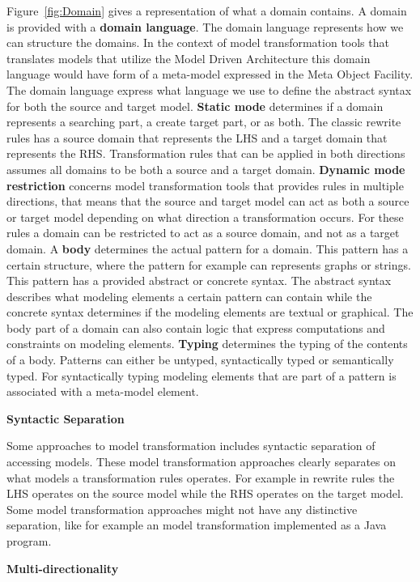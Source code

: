 Figure~\ref{fig:Domain} gives a representation of what a domain contains. A
domain is provided with a \textbf{domain language}. The domain language
represents how we can structure the domains. In the context of model
transformation tools that translates models that utilize the Model Driven
Architecture this domain language would have form of a meta-model expressed in
the Meta Object Facility. The domain language express what language we use to
define the abstract syntax for both the source and target model. \textbf{Static
mode} determines if a domain represents a searching part, a create target part, 
or as both. The classic rewrite rules has a source domain that represents the
LHS and a target domain that represents the RHS. Transformation rules that can
be applied in both directions assumes all domains to be both a source and a
target domain. \textbf{Dynamic mode restriction} concerns model transformation
tools that provides rules in multiple directions, that means that the source
and target model can act as both a source or target model depending on what
direction a transformation occurs. For these rules a domain can be restricted to
act as a source domain, and not as a target domain. A \textbf{body} determines
the actual pattern for a domain. This pattern has a certain structure, where the
pattern for example can represents graphs or strings. This pattern has a
provided abstract or concrete syntax. The abstract syntax describes what
modeling elements a certain pattern can contain while the concrete syntax
determines if the modeling elements are textual or graphical. The body part of a
domain can also contain logic that express computations and constraints on
modeling elements. \textbf{Typing} determines the typing of the contents of a
body. Patterns can either be untyped, syntactically typed or semantically typed.
For syntactically typing modeling elements that are part of a pattern is
associated with a meta-model element.  

\textbf{Syntactic Separation}

Some approaches to model transformation includes syntactic separation of
accessing models. These model transformation approaches clearly separates on
what models a transformation rules operates. For example in rewrite rules the
LHS operates on the source model while the RHS operates on the target model.
Some model transformation approaches might not have any distinctive separation,
like for example an model transformation implemented as a Java program. 

\textbf{Multi-directionality}

